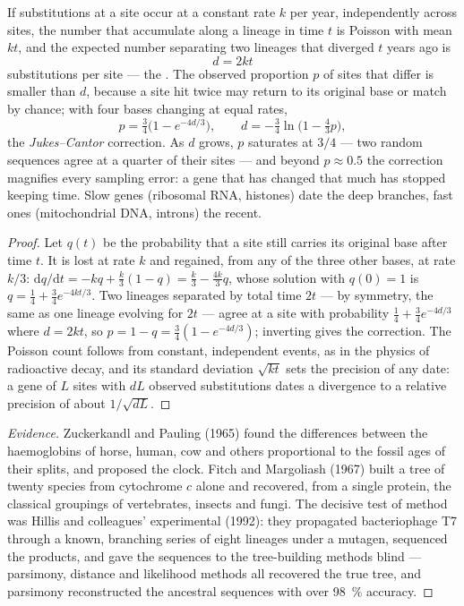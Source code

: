 \begin{theorem}\label{thm:b2:phylogenetic-trees:clock}
If substitutions at a site occur at a constant rate $k$ per year,
independently across sites, the number that accumulate along a
lineage in time $t$ is Poisson with mean $kt$, and the expected
number separating two lineages that diverged $t$ years ago is
\[
d = 2kt
\]
substitutions per site --- the \emph{}. The observed
proportion $p$ of sites that differ is smaller than $d$, because a
site hit twice may return to its original base or match by chance;
with four bases changing at equal rates,
\[
p = \tfrac{3}{4}\bigl(1 - e^{-4d/3}\bigr), \qquad
d = -\tfrac{3}{4}\ln\bigl(1 - \tfrac{4}{3}p\bigr),
\]
the \emph{Jukes--Cantor} correction. As $d$ grows, $p$ saturates at
$3/4$ --- two random sequences agree at a quarter of their sites
--- and beyond $p \approx 0.5$ the correction magnifies every
sampling error: a gene that has changed that much has stopped
keeping time. Slow genes (ribosomal RNA, histones) date the deep
branches, fast ones (mitochondrial DNA, introns) the recent.
\end{theorem}
\begin{proof}
Let $q(t)$ be the probability that a site still carries its
original base after time $t$. It is lost at rate $k$ and regained,
from any of the three other bases, at rate $k/3$:
$\mathrm{d}q/\mathrm{d}t = -kq + \tfrac{k}{3}(1 - q) = \tfrac{k}{3} -
\tfrac{4k}{3}q$, whose solution with $q(0) = 1$ is $q = \tfrac14 +
\tfrac34 e^{-4kt/3}$. Two lineages separated by total time $2t$ ---
by symmetry, the same as one lineage evolving for $2t$ --- agree at
a site with probability $\tfrac14 + \tfrac34 e^{-4d/3}$ where $d =
2kt$, so $p = 1 - q = \tfrac34(1 - e^{-4d/3})$; inverting gives the
correction. The Poisson count follows from constant, independent
events, as in the physics of radioactive decay, and its standard
deviation $\sqrt{kt}$ sets the precision of any date: a gene of $L$
sites with $dL$ observed substitutions dates a divergence to a
relative precision of about $1/\sqrt{dL}$.
\end{proof}
\begin{proof}[Evidence]
Zuckerkandl and Pauling (1965) found the differences between the
haemoglobins of horse, human, cow and others proportional to the
fossil ages of their splits, and proposed the clock. Fitch and
Margoliash (1967) built a tree of twenty species from cytochrome
$c$ alone and recovered, from a single protein, the classical
groupings of vertebrates, insects and fungi. The decisive test of
method was Hillis and colleagues' experimental  (1992):
they propagated bacteriophage T7 through a known, branching series
of eight lineages under a mutagen, sequenced the products, and gave
the sequences to the tree-building methods blind --- parsimony,
distance and likelihood methods all recovered the true tree, and
parsimony reconstructed the ancestral sequences with over
\qty{98}{\%} accuracy.
\end{proof}

